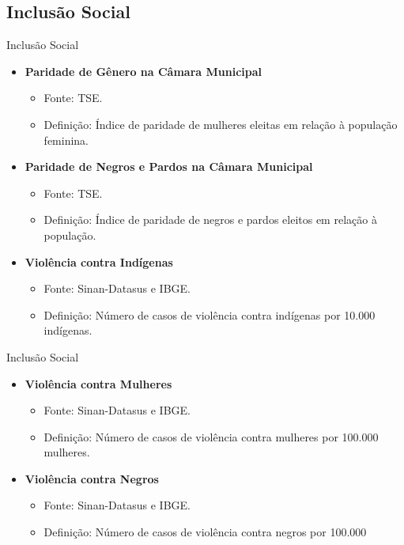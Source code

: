 \documentclass{beamer}
\begin{document}
\subsection{Inclusão Social}
\begin{frame}{Inclusão Social}
\begin{itemize}
    \item \textbf{Paridade de Gênero na Câmara Municipal}
    \begin{itemize}
        \item Fonte: TSE.
        \item Definição: Índice de paridade de mulheres eleitas em relação à população feminina.
    \end{itemize}
    \item \textbf{Paridade de Negros e Pardos na Câmara Municipal}
    \begin{itemize}
        \item Fonte: TSE.
        \item Definição: Índice de paridade de negros e pardos eleitos em relação à população.
    \end{itemize}
    \item \textbf{Violência contra Indígenas}
    \begin{itemize}
        \item Fonte: Sinan-Datasus e IBGE.
        \item Definição: Número de casos de violência contra indígenas por 10.000 indígenas.
    \end{itemize}
\end{itemize}
\end{frame}


\begin{frame}{Inclusão Social}
\begin{itemize}
    \item \textbf{Violência contra Mulheres}
    \begin{itemize}
        \item Fonte: Sinan-Datasus e IBGE.
        \item Definição: Número de casos de violência contra mulheres por 100.000 mulheres.
    \end{itemize}
    \item \textbf{Violência contra Negros}
    \begin{itemize}
        \item Fonte: Sinan-Datasus e IBGE.
        \item Definição: Número de casos de violência contra negros por 100.000 pessoas negras.
    \end{itemize}
\end{itemize}
\end{frame}
\end{document}
